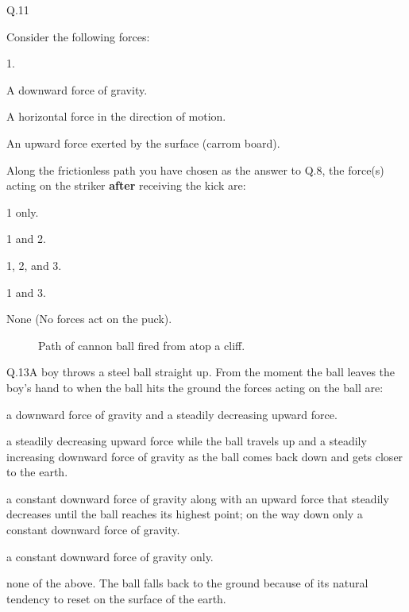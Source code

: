     \begin{mcq}{Q.11}{Consider the following forces:

        \eline[]
        \begin{options}{1.}
            \item A downward force of gravity.
            \item A horizontal force in the direction of motion.
            \item An upward force exerted by the surface (carrom board).
        \end{options}
        \eline[]

        Along the frictionless path you have chosen as the answer to Q.8, the force(s) acting on the striker \textbf{after} receiving the kick are:}
            \item 1 only.
            \item 1 and 2.
            \item 1, 2, and 3.
            \item 1 and 3.
            \item None (No forces act on the puck).
    \end{mcq}


    \begin{figure}[h!]
        \begin{center}
            
            \caption{\label{fig:cannon} Path of cannon ball fired from atop a cliff.\protect\endnotemark}
        \end{center}
    \end{figure}

    \begin{mcq}{Q.13}{A boy throws a steel ball straight up. From the moment the ball leaves the boy's hand to when the ball hits the ground the forces acting on the ball are:}
        \item a downward force of gravity and a steadily decreasing upward force.
        \item a steadily decreasing upward force while the ball travels up and a steadily increasing downward force of gravity as the ball comes back down and gets closer to the earth.
        \item a constant downward force of gravity along with an upward force that steadily decreases until the ball reaches its highest point; on the way down only a constant downward force of gravity.
        \item a constant downward force of gravity only.
        \item none of the above. The ball falls back to the ground because of its natural tendency to reset on the surface of the earth.
    \end{mcq}

